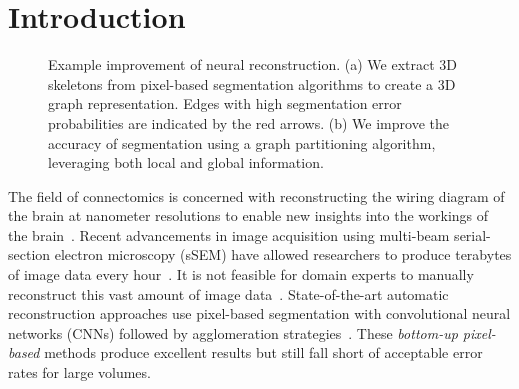 \section{Introduction}

\begin{figure}[t]
	\caption{Example improvement of neural reconstruction. (a) We extract 3D skeletons from pixel-based segmentation algorithms to create a 3D graph representation. Edges with high segmentation error probabilities are indicated by the red arrows. (b) We improve the accuracy of segmentation  using a graph partitioning algorithm, leveraging both local and global information.}
	\label{fig:teaser}
\end{figure}

The field of connectomics is concerned with reconstructing the wiring diagram of the brain at nanometer resolutions to enable new insights into the workings of the brain~\cite{haehn2017scalable,kasthuri2015saturated}. Recent advancements in image acquisition using multi-beam serial-section electron microscopy (sSEM) have allowed researchers to produce terabytes of image data every hour~\cite{hildebrand2017whole}. It is not feasible for domain experts to manually reconstruct this vast amount of image data~\cite{haehn2014design}. State-of-the-art automatic reconstruction approaches use pixel-based segmentation with convolutional neural networks (CNNs) followed by agglomeration strategies~\cite{seymour2016rhoananet,lee2015recursive,nunez2014graph,parag2017anisotropic,ronneberger2015u,zlateski2015image}.
These \textit{bottom-up pixel-based} methods produce excellent results but still fall short of acceptable error rates for large volumes.

